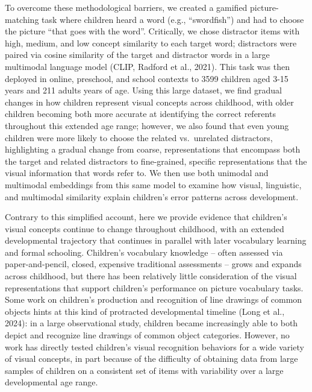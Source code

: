 \documentclass[
  man,floatsintext]{apa6}
\begin{document}
To overcome these methodological barriers, we created a gamified picture-matching task where children heard a word (e.g., ``swordfish'') and had to choose the picture ``that goes with the word''. Critically, we chose distractor items with high, medium, and low concept similarity to each target word; distractors were paired via cosine similarity of the target and distractor words in a large multimodal language model (CLIP, Radford et al., 2021). This task was then deployed in online, preschool, and school contexts to 3599 children aged 3-15 years and 211 adults years of age. Using this large dataset, we find gradual changes in how children represent visual concepts across childhood, with older children becoming both more accurate at identifying the correct referents throughout this extended age range; however, we also found that even young children were more likely to choose the related vs.~unrelated distractors, highlighting a gradual change from coarse, representations that encompass both the target and related distractors to fine-grained, specific representations that the visual information that words refer to. We then use both unimodal and multimodal embeddings from this same model to examine how visual, linguistic, and multimodal similarity explain children's error patterns across development.

Contrary to this simplified account, here we provide evidence that children's visual concepts continue to change throughout childhood, with an extended developmental trajectory that continues in parallel with later vocabulary learning and formal schooling. Children's vocabulary knowledge -- often assessed via paper-and-pencil, closed, expensive traditional assessments -- grows and expands across childhood, but there has been relatively little consideration of the visual representations that support children's performance on picture vocabulary tasks. Some work on children's production and recognition of line drawings of common objects hints at this kind of protracted developmental timeline (Long et al., 2024): in a large observational study, children became increasingly able to both depict and recognize line drawings of common object categories. However, no work has directly tested children's visual recognition behaviors for a wide variety of visual concepts, in part because of the difficulty of obtaining data from large samples of children on a consistent set of items with variability over a large developmental age range.
\end{document}
